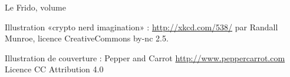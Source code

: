 
 

 



\setcounter{envolume}{1}

\pagestyle{empty}


    \vphantom{Woo}

    \cleardoublepage        %



    \begin{center}
        Le Frido, volume 
    \end{center}

    \newpage


    

    \newpage

    \phantom{WOW}

  \vfill

  \LicenceFDL

  Illustration «crypto nerd imagination» : \url{http://xkcd.com/538/} par Randall Munroe, licence CreativeCommons by-nc 2.5. %

  Illustration de couverture : Pepper and Carrot \url{http://www.peppercarrot.com} Licence CC Attribution 4.0

    \TextePourISBN

    \newpage



